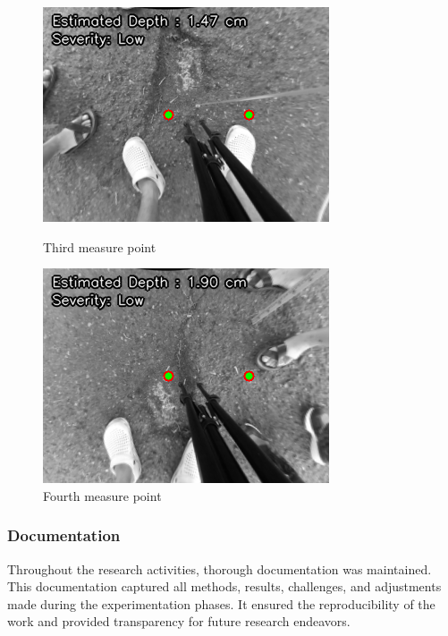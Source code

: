 \begin{figure}[H]
	\begin{minipage}{0.45\textwidth}
		\centering
		\includegraphics[width=\textwidth]{measure3.png}
		\caption{Third measure point}
		\label{fig:image3}
	\end{minipage}
	\hfill
	\begin{minipage}{0.45\textwidth}
		\centering
		\includegraphics[width=\textwidth]{measure4.png}
		\caption{Fourth measure point}
		\label{fig:image4}
	\end{minipage}
\end{figure}


\subsubsection{Documentation}
Throughout the research activities, thorough documentation was maintained. This documentation captured all methods, results, challenges, and adjustments made during the experimentation phases. It ensured the reproducibility of the work and provided transparency for future research endeavors. 

